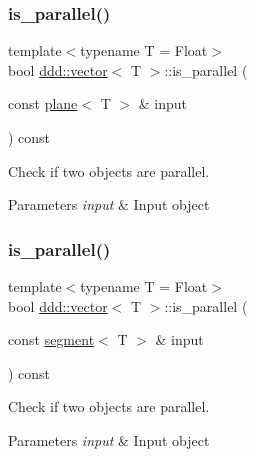\subsubsection{\texorpdfstring{is\+\_\+parallel()}{is\_parallel()}\hspace{0.1cm}{\footnotesize\ttfamily [4/5]}}
{\footnotesize\ttfamily template$<$typename T = Float$>$ \\
bool \hyperlink{classddd_1_1vector}{ddd\+::vector}$<$ T $>$\+::is\+\_\+parallel (\begin{DoxyParamCaption}\item[{const \hyperlink{classddd_1_1plane}{plane}$<$ T $>$ \&}]{input }\end{DoxyParamCaption}) const\hspace{0.3cm}{\ttfamily [inline]}}



Check if two objects are parallel. 


\begin{DoxyParams}{Parameters}
{\em input} & Input object \\
\hline
\end{DoxyParams}
\mbox{\label{classddd_1_1vector_adbf47c4d77ce304c3ac47badc366c2c2}} 
\subsubsection{\texorpdfstring{is\+\_\+parallel()}{is\_parallel()}\hspace{0.1cm}{\footnotesize\ttfamily [5/5]}}
{\footnotesize\ttfamily template$<$typename T = Float$>$ \\
bool \hyperlink{classddd_1_1vector}{ddd\+::vector}$<$ T $>$\+::is\+\_\+parallel (\begin{DoxyParamCaption}\item[{const \hyperlink{classddd_1_1segment}{segment}$<$ T $>$ \&}]{input }\end{DoxyParamCaption}) const\hspace{0.3cm}{\ttfamily [inline]}}



Check if two objects are parallel. 


\begin{DoxyParams}{Parameters}
{\em input} & Input object \\
\hline
\end{DoxyParams}
\mbox{\label{classddd_1_1vector_a8c18336941576daaff53568d424a27bd}} 
